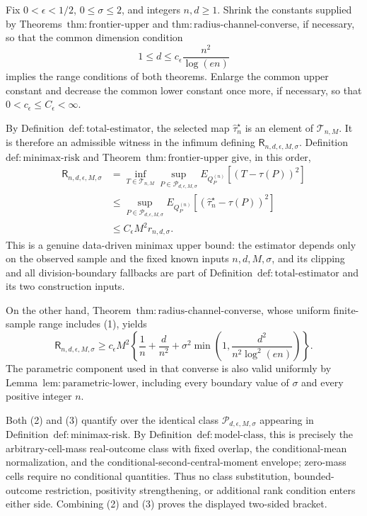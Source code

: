 Fix \(0<\epsilon<1/2\), \(0\le\sigma\le2\), and integers \(n,d\ge1\).  Shrink the constants supplied by Theorems~\(\mathrm{thm:frontier\text{-}upper}\) and \(\mathrm{thm:radius\text{-}channel\text{-}converse}\), if necessary, so that the common dimension condition
\[
 1\le d\le c_{\epsilon}\frac{n^2}{\log(en)}
\tag{1}
\]
implies the range conditions of both theorems.  Enlarge the common upper constant and decrease the common lower constant once more, if necessary, so that \(0<c_{\epsilon}\le C_{\epsilon}<\infty\).

By Definition~\(\mathrm{def:total\text{-}estimator}\), the selected map \(\widehat\tau_n^{\star}\) is an element of \(\mathcal T_{n,M}\).  It is therefore an admissible witness in the infimum defining \(\mathsf R_{n,d,\epsilon,M,\sigma}\).  Definition~\(\mathrm{def:minimax\text{-}risk}\) and Theorem~\(\mathrm{thm:frontier\text{-}upper}\) give, in this order,
\[
\begin{aligned}
 \mathsf R_{n,d,\epsilon,M,\sigma}
 &=\inf_{T\in\mathcal T_{n,M}}
   \sup_{P\in\mathcal P_{d,\epsilon,M,\sigma}}
   E_{Q_P^{(n)}}[(T-\tau(P))^2]\\
 &\le
   \sup_{P\in\mathcal P_{d,\epsilon,M,\sigma}}
   E_{Q_P^{(n)}}[(\widehat\tau_n^{\star}-\tau(P))^2]\\
 &\le C_{\epsilon}M^2r_{n,d,\sigma}.
\end{aligned}
\tag{2}
\]
This is a genuine data-driven minimax upper bound: the estimator depends only on the observed sample and the fixed known inputs \(n,d,M,\sigma\), and its clipping and all division-boundary fallbacks are part of Definition~\(\mathrm{def:total\text{-}estimator}\) and its two construction inputs.

On the other hand, Theorem~\(\mathrm{thm:radius\text{-}channel\text{-}converse}\), whose uniform finite-sample range includes (1), yields
\[
 \mathsf R_{n,d,\epsilon,M,\sigma}
 \ge c_{\epsilon}M^2\left\{
 \frac1n+\frac d{n^2}
 +\sigma^2\min\left(1,\frac{d^2}{n^2\log^2(en)}\right)
 \right\}.
\tag{3}
\]
The parametric component used in that converse is also valid uniformly by Lemma~\(\mathrm{lem:parametric\text{-}lower}\), including every boundary value of \(\sigma\) and every positive integer \(n\).

Both (2) and (3) quantify over the identical class \(\mathcal P_{d,\epsilon,M,\sigma}\) appearing in Definition~\(\mathrm{def:minimax\text{-}risk}\).  By Definition~\(\mathrm{def:model\text{-}class}\), this is precisely the arbitrary-cell-mass real-outcome class with fixed overlap, the conditional-mean normalization, and the conditional-second-central-moment envelope; zero-mass cells require no conditional quantities.  Thus no class substitution, bounded-outcome restriction, positivity strengthening, or additional rank condition enters either side.  Combining (2) and (3) proves the displayed two-sided bracket.

